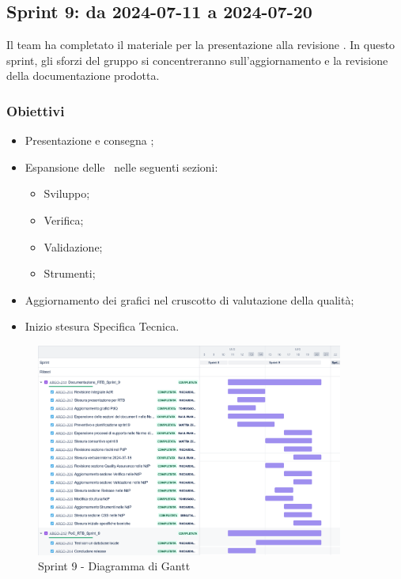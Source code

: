 \subsection{Sprint 9: da 2024-07-11 a 2024-07-20}
\par Il team ha completato il materiale per la presentazione alla revisione . In questo sprint, gli sforzi del gruppo si concentreranno sull’aggiornamento e la revisione della documentazione prodotta.

\subsubsection{Obiettivi}
\begin{itemize}
  \item Presentazione e consegna ;
  \item Espansione delle \NdP\ nelle seguenti sezioni:
  \begin{itemize}
    \item Sviluppo;
    \item Verifica;
    \item Validazione;
    \item Strumenti;
  \end{itemize}
  \item Aggiornamento dei grafici nel cruscotto di valutazione della qualità;
  \item Inizio stesura Specifica Tecnica.
\end{itemize}

\begin{figure}[H]
  \centering
  \includegraphics[width=0.90\textwidth]{assets/Pianificazione/Sprint-9/gantt.png}
  \caption{Sprint 9 - Diagramma di Gantt}\label{fig:sprint-9-gantt}
\end{figure}

